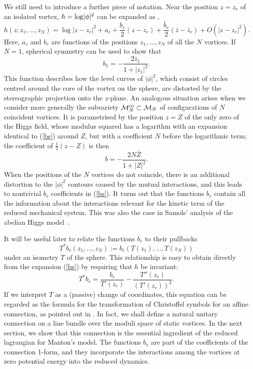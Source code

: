 \documentclass[a4paper,11pt]{article}
\begin{document}
We still need to introduce a further piece of notation. 
Near the position $z=z_{r}$ of an isolated vortex, 
$h={\rm log}|\phi|^{2}$ can be expanded as
\cite{Str}, \cite{Sam}
\begin{equation}\label{bs}
h(z;z_{1},\ldots,z_{N})=
\log|z-z_{r}|^{2} + a_{r} + \frac{b_{r}}{2}(z-z_{r}) + \frac{\bar{b}_{r}}{2}
(\bar{z}-\bar{z}_{r})+O(|z-z_{r}|^{2}).  
\end{equation}
Here, $a_{r}$ and $b_{r}$ are functions of the positions
$z_{1},\ldots, z_{N}$ of all the $N$ vortices.
If $N=1$, spherical symmetry can be used to show that \cite{Msmv}
\[
b_{1}=-\frac{2\bar{z}_{1}}{1+|z_{1}|^{2}}.
\]
This function describes how the level curves of $|\phi|^{2}$, 
which consist of
circles centred around the core of the vortex on the sphere, are 
distorted by the stereographic projection onto the $z$-plane. 
An analogous situation arises when we consider more generally the 
subvariety ${\cal M}_{N}^{\rm co}\subset{\cal M}_{N}$ of 
configurations of $N$ coincident
vortices. It is parametrised by the position $z=Z$ of the only zero 
of the Higgs
field, whose modulus squared has a logarithm with an 
expansion identical to (\ref{bs})
around $Z$, but with a coefficient $N$ before the logarithmic term; the
coefficient of $\frac{1}{2}(z-Z)$ is then
\begin{equation}\label{bN}
b=-\frac{2N\bar{Z}}{1+|Z|^{2}}.
\end{equation}
When the positions of the $N$ vortices do not coincide, there is an 
additional distortion
to the $|\phi|^{2}$ contours caused by the mutual interactions, and 
this leads to nontrivial $b_{r}$ coefficients in (\ref{bs}).
It turns out that the functions $b_{r}$ contain all the information about 
the interactions relevant for the kinetic term of the reduced
mechanical system. This was also the case in Samols' analysis of
the abelian Higgs model~\cite{Sam}.


It will be useful later to relate the functions $b_{r}$ to their
pullbacks
\[
T^{*}b_{r}(z_{1},\ldots,z_{N}):=b_{r}(T(z_{1}),\ldots,T(z_{N})) 
\]
under an isometry $T$ of the sphere. This relationship is
easy to obtain directly from the expansion (\ref{bs}) by requiring
that $h$ be invariant:
\begin{equation}\label{btransf}
T^{*}b_{r}= \frac{b_{r}}{T'(z_{r})}-
\frac{T''(z_{r})}{\left(T'(z_{r})\right)^{2}}.
\end{equation}
If we interpret $T$ as a (passive) change of coordinates, this equation 
can be regarded as the formula for the transformation of Christoffel 
symbols for an affine connection, as pointed out in \cite{MNvvms}. 
In fact, we shall define a natural unitary 
connection on a line bundle over the moduli space of static 
vortices. In the next section, we show that this connection is the 
essential ingredient of the reduced lagrangian for Manton's model.
The functions $b_{r}$ are part of the coefficients of the connection
1-form, and they incorporate the interactions among the vortices 
at zero potential energy into the reduced dynamics.
\end{document}
